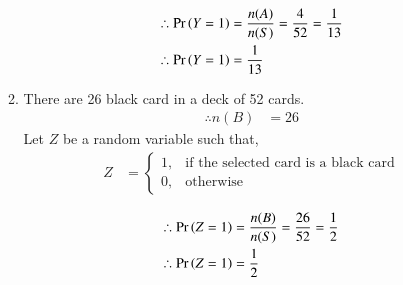 \documentclass[journal,12pt,twocolumn]{IEEEtran}
\begin{document}
\begin{enumerate}[label=(\alph*)]
\begin{enumerate}[label=\roman*)]
				\begin{align}
					\therefore \Pr\left(Y=1\right) &= \frac{n(A)}{n(S)} 
							  = \frac{4}{52}
							  = \frac{1}{13}\\
					\therefore \Pr\left(Y=1\right) &= \frac{1}{13}
				\end{align}
			\item		
				There are 26 black card in a deck of 52 cards.
				\begin{align}
					\therefore n(B) &= 26
				\end{align}
				Let $Z$ be a random variable such that,
				\begin{align}
					Z &= 
					\begin{cases}
						1, & \text{if the selected card is a black card}\\
						0, & \text{otherwise}
					\end{cases}
				\end{align}

				\begin{align}
					\therefore \Pr\left(Z=1\right) &= \frac{n(B)}{n(S)}
							   = \frac{26}{52}
							   = \frac{1}{2}\\
					\therefore \Pr\left(Z=1\right) &= \frac{1}{2}
				\end{align}

		\end{enumerate}	

\end{enumerate}
\end{document}
